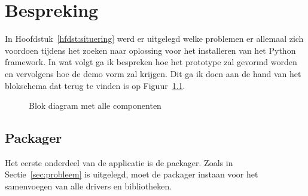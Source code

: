 \chapter{Bespreking}
In Hoofdstuk~\vref{hfdst:situering} werd er uitgelegd welke problemen er allemaal zich voordoen tijdens het zoeken naar oplossing voor het installeren van het Python framework. 
In wat volgt ga ik bespreken hoe het prototype zal gevormd worden en vervolgens hoe de demo vorm zal krijgen.
Dit ga ik doen aan de hand van het blokschema dat terug te vinden is op Figuur~\ref{fig:overzichtBlok}.

\begin{figure}[!h]
\centering
  
  \caption{Blok diagram met alle componenten}
  \label{fig:overzichtBlok}
\end{figure}

\section{Packager}
Het eerste onderdeel van de applicatie is de packager.
Zoals in Sectie~\ref{sec:probleem} is uitgelegd, moet de packager instaan voor het samenvoegen van alle drivers en bibliotheken.
%
%

